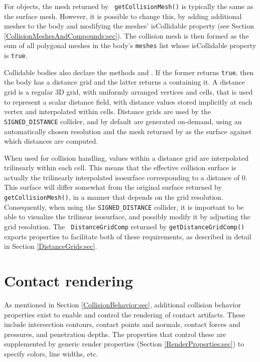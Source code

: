 For  objects, the mesh returned by {\tt
getCollisionMesh()} is typically the same as the surface mesh.
However, it is possible to change this, by adding additional meshes to
the body and modifying the meshes' {\sf isCollidable} property (see
Section
\ref{CollisionMeshesAndCompounds:sec}). The collision mesh is then formed
as the sum of all polygonal meshes in the body's {\tt meshes} list
whose {\sf isCollidable} property is {\tt true}.

Collidable bodies also declare the methods
and
.
If the former returns {\tt true}, then the body has a distance grid
and the latter returns a 
containing it.  A distance grid is a regular 3D grid, with uniformly
arranged vertices and cells, that is used to represent a scalar
distance field, with distance values stored implicitly at each vertex
and interpolated within cells. Distance grids are used by the {\tt
SIGNED\_DISTANCE} collider, and by default are generated
on-demand, using an automatically chosen resolution and the mesh
returned by
as the surface against which distances are computed.

When used for collision handling, values within a distance grid are
interpolated trilinearly within each cell. This means that the
effective collision surface is actually the trilinearly interpolated
isosurface corresponding to a distance of 0. This surface will differ
somewhat from the original surface returned by {\tt
getCollisionMesh()}, in a manner that depends on the grid resolution.
Consequently, when using the {\tt SIGNED\_DISTANCE} collider, it
is important to be able to visualize the trilinear isosurface, and
possibly modify it by adjusting the grid resolution. The {\tt
DistanceGridComp} returned by {\tt getDistanceGridComp()} exports
properties to facilitate both of these requirements, as described in
detail in Section \ref{DistanceGrids:sec}.

\section{Contact rendering}
\label{ContactRendering:sec}

As mentioned in Section \ref{CollisionBehavior:sec}, additional
collision behavior properties exist to enable and control the
rendering of contact artifacts. These include intersection contours,
contact points and normals, contact forces and pressures, and
penetration depths. The properties that control these are supplemented
by generic render properties (Section \ref{RenderProperties:sec}) to
specify colors, line widths, etc. 


